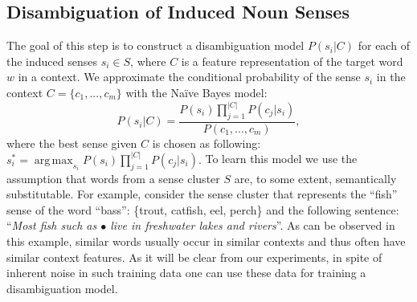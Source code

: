 \documentclass[11pt]{article}
\newcommand{\parm}{ \mathord{\bullet}}
\DeclareMathOperator*{\argmax}{arg\,max}
\begin{document}
%



\subsection{Disambiguation of Induced Noun Senses}

The goal of this step is to construct a disambiguation model  $P(s_i|C)$ for each of the induced senses $s_i \in S$, where $C$ is a feature representation of the target word $w$ in a context. We approximate the conditional probability of the sense $s_i$ in the context $C= \{ c_1,..., c_{m}\}$ with the Na\"ive Bayes model:  
\begin{equation}
P(s_i|C) = \frac{P(s_i)\prod_{j=1}^{|C|} P(c_j|s_i)}{P(c_1,...,c_m)},
\end{equation}
where the best sense given $C$ is chosen as following: $s_i^* = \argmax_{s_i} P(s_i)\prod_{j=1}^{|C|} P(c_j|s_i).$ To learn this model we use the assumption that words from a sense cluster $S$ are, to some extent, semantically substitutable. For example, consider the sense cluster that represents the ``fish'' sense of the word ``bass'': \{trout, catfish, eel, perch\} and the following sentence: ``\textit{Most fish such as $\parm$ live in freshwater lakes and rivers}''. As can be observed in this example, similar words usually occur in similar contexts and thus often have similar context features. As it will be clear from our experiments, in spite of inherent noise in such training data one can use these data for training a disambiguation model. 
\end{document}
